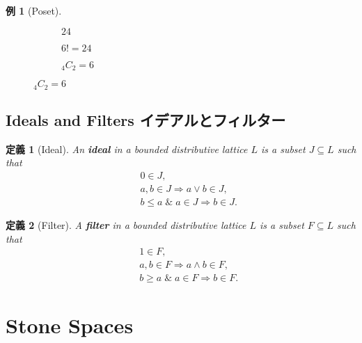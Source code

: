 \documentclass[a4j,12pt]{jarticle}
\numberwithin{equation}{section}
\newtheorem{example}{例}[section]
\newcommand{\itbf}[1]{\textit{\textbf{#1}}}
\newtheorem{dfn}{定義}[section]
\begin{document}
\begin{example}[Poset]
\begin{figure}[H]
\begin{subfigure}{0.1\textwidth}
      \caption*{$24$}
    \end{subfigure}
    \begin{subfigure}{0.1\textwidth}
      \caption*{$6!=24$}
    \end{subfigure}
    \begin{subfigure}{0.1\textwidth}
      \caption*{${}_4C_2=6$}
    \end{subfigure}
  \end{figure}  
\end{example}
\subsection{Ideals and Filters イデアルとフィルター}
\begin{dfn}[Ideal]
  An \itbf{ideal} in a bounded distributive lattice $L$ is a subset $J \subseteq L$ such that
  \begin{eqnarray}
    \label{eq:ideal}
    && 0 \in J,\\
    && a,b \in J \Rightarrow a \vee b \in J,\\
    && b\le a \;\&\; a \in J \Rightarrow b \in J.
  \end{eqnarray}
\end{dfn}
\begin{dfn}[Filter]
  A \itbf{filter} in a bounded distributive lattice $L$ is a subset $F \subseteq L$ such that
  \begin{eqnarray}
    \label{eq:filter}
    && 1 \in F,\\
    && a,b \in F \Rightarrow a \wedge b \in F,\\
    && b \ge a \;\&\; a \in F \Rightarrow b \in F.
  \end{eqnarray}
\end{dfn}
\section{Stone Spaces}
\end{document}
